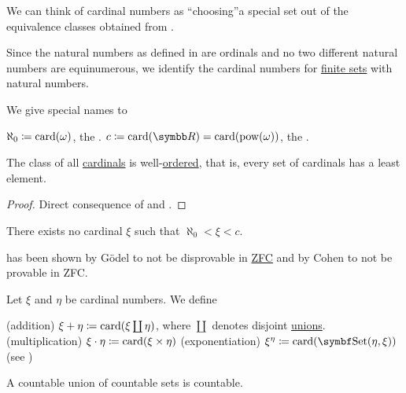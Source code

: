 \begin{Remark}\label{remark:cardinals}
  We can think of cardinal numbers as \enquote{choosing}\AOC a special set out of the equivalence classes obtained from .

  Since the natural numbers as defined in  are ordinals and no two different natural numbers are equinumerous, we identify the cardinal numbers for \hyperref[def:finite_set]{finite sets} with natural numbers.

  We give special names to
  \begin{RemEnum}
     \( \aleph_0 \coloneqq \operatorname{card}(\omega) \), the .
     \( c \coloneqq \Card(\BR) = \Card(\Pow(\omega)) \), the .
  \end{RemEnum}
\end{Remark}

\begin{Proposition}\label{thm:cardinals_well_ordered}
  The class of all \hyperref[def:cardinal]{cardinals} is well-\hyperref[def:well_ordered_set]{ordered}, that is, every set of cardinals has a least element.
\end{Proposition}
\begin{proof}
  Direct consequence of  and .
\end{proof}

\begin{Hypothesis}\label{hyp:continuum_hypothesis}\cite[165]{Enderton1977}
  There exists no cardinal \( \xi \) such that \( \aleph_0 < \xi < c \).
\end{Hypothesis}

\begin{Remark}\label{remark:continuum_hypothesis}\cite[165]{Enderton1977}
   has been shown by G\"odel to not be disprovable in \hyperref[def:set_zfc]{ZFC} and by Cohen to not be provable in ZFC.
\end{Remark}

\begin{Definition}\label{def:cardinal_arithmetic}
  Let \( \xi \) and \( \eta \) be cardinal numbers. We define
  \begin{DefEnum}
    (addition) \( \xi + \eta \coloneqq \operatorname{card}(\xi \coprod \eta) \), where \( \coprod \) denotes disjoint \hyperref[def:disjoint_union]{unions}.
    (multiplication) \( \xi \cdot \eta \coloneqq \operatorname{card}(\xi \times \eta) \)
    (exponentiation) \( \xi^\eta \coloneqq \Card(\Cat{Set}(\eta, \xi)) \) (see )
  \end{DefEnum}
\end{Definition}

\begin{Proposition}\label{thm:countable_union_of_countable_sets}\cite[Theorem6Q]{Enderton1977}
  A countable union of countable sets is countable.
\end{Proposition}
